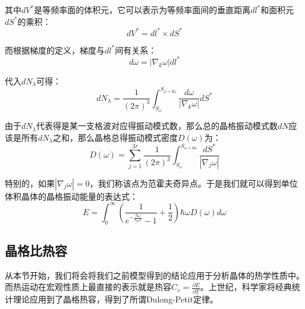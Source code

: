 \documentclass{ctexart}
\begin{document}
                其中$dV^*$是等频率面的体积元，它可以表示为等频率面间的垂直距离$dl^*$和面积元$dS^*$的乘积：
                \begin{equation}
                    dV^*=dl^*\times dS^*
                \end{equation}
                
                而根据梯度的定义，梯度与$dl^*$间有关系：
                \begin{equation}
                    d\omega=|\nabla_k\omega|dl^*
                \end{equation}
                
                代入$dN_\lambda$可得：
                \begin{equation}
                     dN_\lambda=\frac{1}{(2\pi)^3}\int_{S_\omega}^{S_{\omega+d\omega}}\frac{d\omega}{|\nabla_k\omega|}dS^*
                \end{equation}
                
                由于$dN_\lambda$代表得是某一支格波对应得振动模式数，那么总的晶格振动模式数$dN$应该是所有$dN_\lambda$之和，那么晶格总得振动模式密度$D(\omega)$为：
                \begin{equation}\label{equ:D_omega}
                    D(\omega)=\sum_{j=1}^{3r}\frac{1}{(2\pi)^3}\int_{S_\omega}^{S_{\omega+d\omega}}\frac{dS^*}{|\nabla_j\omega|}
                \end{equation}
                
                特别的，如果$|\nabla_j\omega|=0$，我们称该点为范霍夫奇异点。于是我们就可以得到单位体积晶体的晶格振动能量的表达式：
                \begin{equation}\label{equ:G}
                    E=\int_0^\infty (\frac{1}{e^{-\frac{\hbar\omega}{k_BT}}-1}+\frac{1}{2})\hbar\omega D(\omega)d\omega
                \end{equation}

                
                \subsection{晶格比热容}
                从本节开始，我们将会将我们之前模型得到的结论应用于分析晶体的热学性质中。而热运动在宏观性质上最直接的表示就是热容$C_v=\frac{\partial E}{\partial T}$。上世纪，科学家将经典统计理论应用到了晶格热容，得到了所谓Dulong-Petit定律。
                
\end{document}

